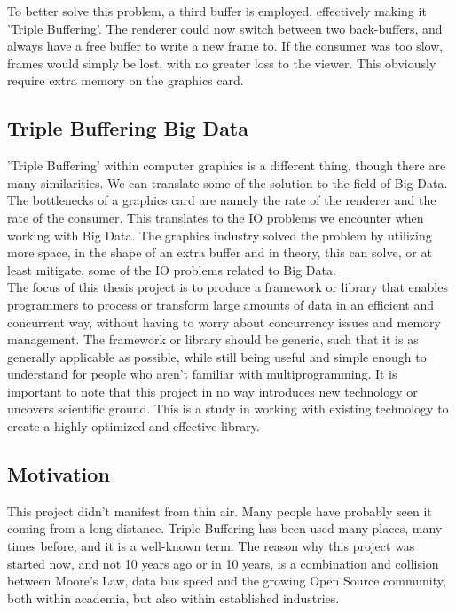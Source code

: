 \documentclass[a4paper]{article}
\begin{document}
To better solve this problem, a third buffer is employed, effectively making it 'Triple Buffering'. The renderer could now
switch between two back-buffers, and always have a free buffer to write a new frame to. If the consumer was too slow, frames
would simply be lost, with no greater loss to the viewer. This obviously require extra memory on the graphics card.\\


\subsection{Triple Buffering Big Data}
'Triple Buffering' within computer graphics is a different thing, though there are many similarities. We can translate some of the solution
to the field of Big Data. The bottlenecks of a graphics card are namely the rate of the renderer and the rate of the consumer. This translates to the IO problems we encounter when working with Big Data. The graphics industry solved the problem by utilizing more space, in the shape of an extra buffer
and in theory, this can solve, or at least mitigate, some of the IO problems related to Big Data.\\


The focus of this thesis project is to produce a framework or library that enables programmers to process or transform
large amounts of data in an efficient and concurrent way, without having to worry about concurrency issues and memory
management. The framework or library should be generic, such that it is as generally applicable as possible, while still
being useful and simple enough to understand for people who aren't familiar with multiprogramming. It is important to note
that this project in no way introduces new technology or uncovers scientific ground. This is a
study in working with existing technology to create a highly optimized and effective library.



\subsection{Motivation}
This project didn't manifest from thin air. Many people have probably seen it coming from a long
distance. Triple Buffering has been used many places, many times before, and it is a well-known
term. The reason why this project was started now, and not 10 years ago or in 10 years, is a combination and collision between
Moore's Law, data bus speed and the growing Open Source community, both within academia, but also within established industries.
\end{document}
